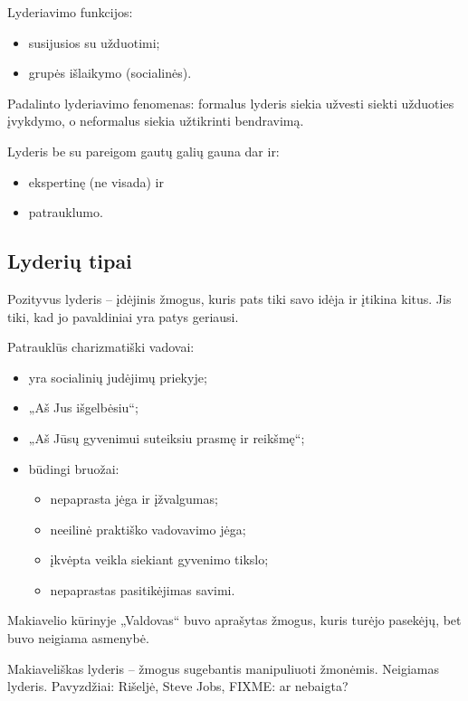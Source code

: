 Lyderiavimo funkcijos:
\begin{itemize}
  \item susijusios su užduotimi;
  \item grupės išlaikymo (socialinės).
\end{itemize}

Padalinto lyderiavimo fenomenas: formalus lyderis siekia užvesti siekti
užduoties įvykdymo, o neformalus siekia užtikrinti bendravimą.

Lyderis be su pareigom gautų galių gauna dar ir:
\begin{itemize}
  \item ekspertinę (ne visada) ir
  \item patrauklumo.
\end{itemize}

\subsection{Lyderių tipai}

Pozityvus lyderis – įdėjinis žmogus, kuris pats tiki savo idėja ir įtikina
kitus. Jis tiki, kad jo pavaldiniai yra patys geriausi.

Patrauklūs charizmatiški vadovai:
\begin{itemize}
  \item yra socialinių judėjimų priekyje;
  \item „Aš Jus išgelbėsiu“;
  \item „Aš Jūsų gyvenimui suteiksiu prasmę ir reikšmę“;
  \item būdingi bruožai:
    \begin{itemize}
      \item nepaprasta jėga ir įžvalgumas;
      \item neeilinė praktiško vadovavimo jėga;
      \item įkvėpta veikla siekiant gyvenimo tikslo;
      \item nepaprastas pasitikėjimas savimi.
    \end{itemize}
\end{itemize}

Makiavelio kūrinyje „Valdovas“ buvo aprašytas žmogus, kuris turėjo
pasekėjų, bet buvo neigiama asmenybė.

Makiaveliškas lyderis – žmogus sugebantis manipuliuoti žmonėmis.
Neigiamas lyderis. Pavyzdžiai: Rišeljė, Steve Jobs, FIXME: ar nebaigta?

